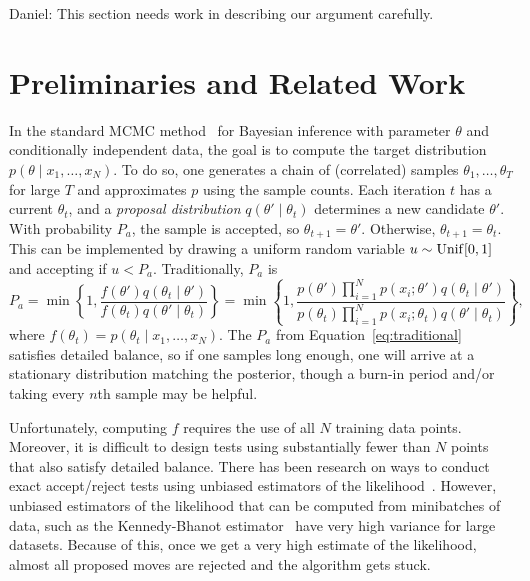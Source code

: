 \documentclass{article}
\begin{document}
{\color{blue}
Daniel: This section needs work in describing our argument carefully.
}



\section{Preliminaries and Related Work}\label{sec:related_work}

In the standard MCMC method~\cite{gilks1996markov,brooks2011handbook} for Bayesian inference with
parameter $\theta$ and conditionally independent data, the goal is to compute the target
distribution $p(\theta \mid x_1, \ldots, x_N)$.  To do so, one generates a chain of (correlated)
samples $\theta_1, \ldots, \theta_T$ for large $T$ and approximates $p$ using the sample counts.
Each iteration $t$ has a current $\theta_t$, and a \emph{proposal distribution} $q(\theta' \mid
\theta_t)$ determines a new candidate $\theta'$. With probability $P_a$, the sample is accepted, so
$\theta_{t+1} = \theta'$. Otherwise, $\theta_{t+1} = \theta_t$. This can be implemented by drawing
a uniform random variable $u \sim {\rm Unif}[0,1]$ and accepting if $u < P_a$. Traditionally, $P_a$ is
\begin{equation}\label{eq:traditional}
P_a = \min\left\{ 1, \frac{f(\theta')q(\theta_t \mid \theta')}{f(\theta_t)q(\theta' \mid \theta_t)}
\right\} = \min\left\{ 1, \frac{p(\theta')\prod_{i=1}^N p(x_i ; \theta')q(\theta_t \mid \theta')}{p(\theta_t)\prod_{i=1}^N p(x_i ; \theta_t)q(\theta' \mid
\theta_t)} \right\},
\end{equation}
where $f(\theta_t)=p(\theta_t \mid x_1,\ldots,x_N)$. The $P_a$ from Equation~\ref{eq:traditional}
satisfies detailed balance, so if one samples long enough, one will arrive at a stationary
distribution matching the posterior, though a burn-in period and/or taking every $n$th sample may be
helpful.

Unfortunately, computing $f$ requires the use of all $N$ training data points. Moreover, it is
difficult to design tests using substantially fewer than $N$ points that also satisfy detailed
balance. There has been research on ways to conduct exact accept/reject tests using unbiased
estimators of the likelihood~\cite{Andrieu09thepseudo-marginal}. However, unbiased estimators of the
likelihood that can be computed from minibatches of data, such as the Kennedy-Bhanot
estimator~\cite{PhysRevD} have very high variance for large datasets. Because of this, once we get a
very high estimate of the likelihood, almost all proposed moves are rejected and the algorithm gets
stuck.
\end{document}
